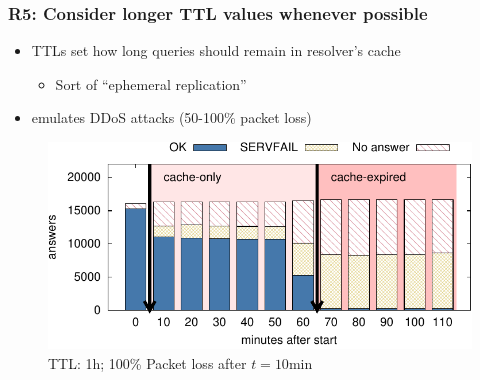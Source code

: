 \documentclass[11pt,show 
notes,notheorems,noamsthm,blank]{beamer} %
\begin{document}
\begin{frame}
 \frametitle{R5: Consider longer TTL values whenever 
possible}
\begin{itemize}
 \item TTLs set how long queries should remain in resolver's cache
\begin{itemize}
   \item Sort of ``ephemeral replication''
\end{itemize}

 \item  \cite{Moura18b}  emulates DDoS attacks (50-100\% packet loss)

 
\end{itemize}


\begin{figure}
\centering
\includegraphics[width=0.7\columnwidth]{fig/hist.pdf}
 \caption{TTL: 1h; 100\%  Packet loss after $t=10$min}
\label{fig:class-valid-queries}
\end{figure}

\end{frame}
\end{document}
